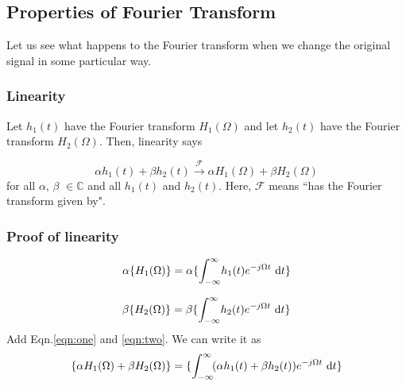 \subsection{Properties of Fourier Transform}
	Let us see what happens to the Fourier transform when we change the original signal in some particular way.
	\subsubsection{Linearity}
		Let $h_1(t)$ have the Fourier transform $H_1(\Omega)$ and let $h_2(t)$ have the Fourier transform $H_2(\Omega)$. Then, linearity says



		\[\alpha h_1(t) + \beta h_2(t) \xrightarrow{\mathcal{F}} \alpha H_1(\Omega)+ \beta H_2(\Omega)\]
		for all $\alpha$, $\beta$ $\in \mathbb{C}$ and all $h_1(t)$ and $h_2(t)$. Here, ${\mathcal{F}}$ means ``has the Fourier transform given by".

	\subsubsection{Proof of linearity}
		\begin{equation}
			 \alpha \{ H_1(\Omega) \} = \alpha \{ \int_{-\infty}^{\infty} \! h_1(t)e^{-j\Omega t} \ \mathrm{d} t \}
			\label{eqn:one}
		\end{equation}

		\begin{equation}
			 \beta \{ H_2(\Omega) \} = \beta \{ \int_{-\infty}^{\infty} \! h_2(t)e^{-j\Omega t} \ \mathrm{d} t \}
			\label{eqn:two}
		\end{equation}
		Add Eqn.\ref{eqn:one} and \ref{eqn:two}. We can write it as
		\begin{equation}
			\{ \alpha H_1(\Omega) + \beta H_2(\Omega) \} = \{ \int_{-\infty}^{\infty} \! (\alpha h_1(t) + \beta h_2(t))e^{-j\Omega t} \ \mathrm{d} t \}
		\end{equation}

